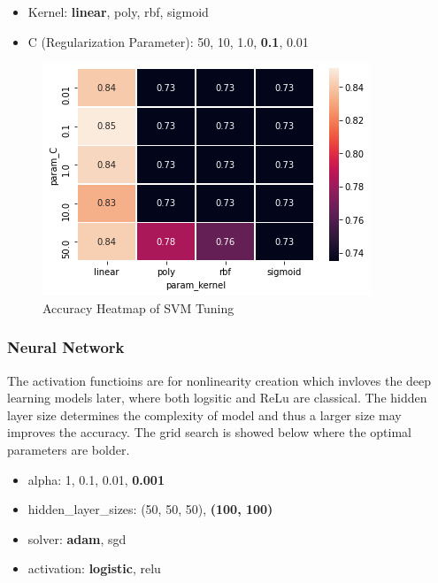 \documentclass[10pt,twocolumn,letterpaper]{article}
\begin{document}
\begin{itemize}
    \item Kernel: \textbf{linear}, poly, rbf, sigmoid
    \item C (Regularization Parameter): 50, 10, 1.0, \textbf{0.1}, 0.01
\end{itemize}

\begin{figure}[ht]
\begin{center}
    \includegraphics[width=0.8\linewidth]{images/SVM_Heatmap.png}
\end{center}
   \caption{Accuracy Heatmap of SVM Tuning}
\label{fig:SVMHeatmap}
\end{figure}


\subsubsection{Neural Network}
The activation functioins are for nonlinearity creation which invloves the deep learning models later, where both logsitic and ReLu are classical. The hidden layer size determines the complexity of model and thus a larger size may improves the accuracy. The grid search is showed below where the optimal parameters are bolder.

\begin{itemize}
    \item alpha: 1, 0.1, 0.01, \textbf{0.001}
    \item hidden\_layer\_sizes: (50, 50, 50), \textbf{(100, 100)}
    \item solver: \textbf{adam}, sgd
    \item activation: \textbf{logistic}, relu
\end{itemize}


\end{document}
